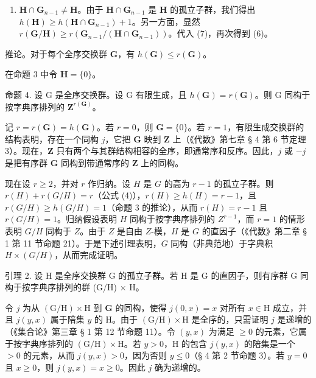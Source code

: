 \begin{enumerate}
\def\labelenumi{(\alph{enumi})}
\setcounter{enumi}{1}
\tightlist
\item
  \(\mathbf{H} \cap \mathbf{G}_{n-1} \neq \mathbf{H}\)。由于 \(\mathbf{H} \cap \mathbf{G}_{n-1}\) 是 \(\mathbf{H}\) 的孤立子群，我们得出 \(h(\mathbf{H}) \geqslant h(\mathbf{H} \cap \mathbf{G}_{n-1}) + 1\)。另一方面，显然 \(r(\mathbf{G}/\mathbf{H}) \geqslant r(\mathbf{G}_{n-1}/(\mathbf{H} \cap \mathbf{G}_{n-1}))\)。代入 (7)，再次得到 (6)。
\end{enumerate}

推论。对于每个全序交换群 \(\mathbf{G}\)，有 \(h(\mathbf{G}) \leqslant r(\mathbf{G})\)。

在命题 3 中令 \(\mathbf{H} = \{0\}\)。

命题 4. 设 G 是全序交换群。设 G 有限生成，且 \(h(\mathbf{G}) = r(\mathbf{G})\)。则 G 同构于按字典序排列的 \(\mathbf{Z}^{r(\mathbf{G})}\)。

记 \(r = r(\mathbf{G}) = h(\mathbf{G})\)。若 \(r = 0\)，则 \(\mathbf{G} = \{0\}\)。若 \(r = 1\)，有限生成交换群的结构表明，存在一个同构 \(j\)，它把 \(\mathbf{G}\) 映到 \(\mathbf{Z}\) 上（《代数》第七章 § 4 第 6 节定理 3）。现在，\(\mathbf{Z}\) 只有两个与其群结构相容的全序，即通常序和反序。因此，\(j\) 或 \(-j\) 是把有序群 \(\mathbf{G}\) 同构到带通常序的 \(\mathbf{Z}\) 上的同构。

现在设 \(r \geqslant 2\)，并对 \(r\) 作归纳。设 \(H\) 是 \(G\) 的高为 \(r - 1\) 的孤立子群。则 \(r(H) + r(G/H) = r\)（公式 (4)），\(r(H) \geqslant h(H) = r - 1\)，且 \(r(G/H) \geqslant h(G/H) = 1\)（命题 3 的推论），从而 \(r(H) = r - 1\) 且 \(r(G/H) = 1\)。归纳假设表明 \(H\) 同构于按字典序排列的 \(Z^{r-1}\)，而 \(r = 1\) 的情形表明 \(G/H\) 同构于 \(Z\)。由于 \(Z\) 是自由 \(Z\)-模，\(H\) 是 \(G\) 的直因子（《代数》第二章 § 1 第 11 节命题 21）。于是下述引理表明，\(G\) 同构（非典范地）于字典积 \(H \times (G/H)\)，从而完成证明。

引理 2. 设 H 是全序交换群 G 的孤立子群。若 H 是 G 的直因子，则有序群 G 同构于按字典序排列的群 (G/H) × H。

令 \(j\) 为从 \((\mathrm{G} / \mathrm{H}) \times \mathrm{H}\) 到 \(\mathbf{G}\) 的同构，使得 \(j(0, x) = x\) 对所有 \(x \in \mathrm{H}\) 成立，并且 \(j(y, x)\) 属于陪集 \(y\) 的 \(\mathrm{H}\)。由于 \((\mathrm{G} / \mathrm{H}) \times \mathrm{H}\) 是全序的，只需证明 \(j\) 是递增的（《集合论》第三章 § 1 第 12 节命题 11）。令 \((y, x)\) 为满足 \(\geqslant 0\) 的元素，它属于按字典序排列的 \((\mathrm{G} / \mathrm{H}) \times \mathrm{H}\)。若 \(y > 0\)，\(\mathrm{H}\) 的包含 \(j(y, x)\) 的陪集是一个 \(> 0\) 的元素，从而 \(j(y, x) > 0\)，因为否则 \(y \leqslant 0\)（§ 4 第 2 节命题 3）。若 \(y = 0\) 且 \(x \geqslant 0\)，则 \(j(y, x) = x \geqslant 0\)。因此 \(j\) 确为递增的。

